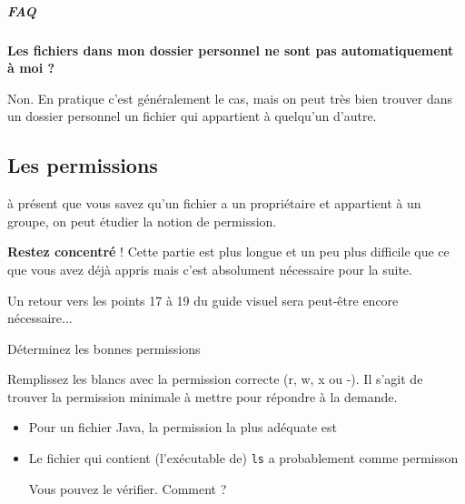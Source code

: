 \documentclass[a4paper,11pt]{style-esi/td}
\begin{document}
		\subparagraph{FAQ} 

\textbf{Les fichiers dans mon dossier personnel ne sont pas automatiquement à moi ?}

Non. En pratique c'est généralement le cas, 
mais on peut très bien trouver dans un dossier personnel un fichier qui appartient à quelqu'un d'autre.  


        \subsection{Les permissions}  
à présent que vous savez qu'un fichier a un propriétaire et appartient à un groupe, 
on peut étudier la notion de permission.    

\textbf{Restez concentré} ! 
Cette partie est plus longue et un peu plus difficile que ce que vous avez déjà appris 
mais c'est absolument nécessaire pour la suite.   

Un retour vers les points 17 à 19 du guide visuel sera peut-\^etre encore nécessaire...  


\begin{Exercice}{Déterminez les bonnes permissions}
	
	Remplissez les blancs avec la permission correcte (r, w, x ou -).  Il s'agit
	de trouver la permission minimale à mettre pour répondre à la demande.   
	
	\begin{itemize}
		
		\item Pour un fichier Java, la permission la plus adéquate est
			\textcolor{gray}{\underline{\hspace*{1em}}}
			\textcolor{gray}{\underline{\hspace*{1em}}}
			\textcolor{gray}{\underline{\hspace*{1em}}} 
	
		\item Le fichier qui contient (l'exécutable de) \texttt{ls}
			a probablement comme permisson\\
		\textcolor{gray}{\underline{\hspace*{1em}}}
		\textcolor{gray}{\underline{\hspace*{1em}}}
		\textcolor{gray}{\underline{\hspace*{1em}}}

		    Vous pouvez le vérifier. Comment ? 
	
\end{itemize}
	
\end{Exercice}
\end{document}
